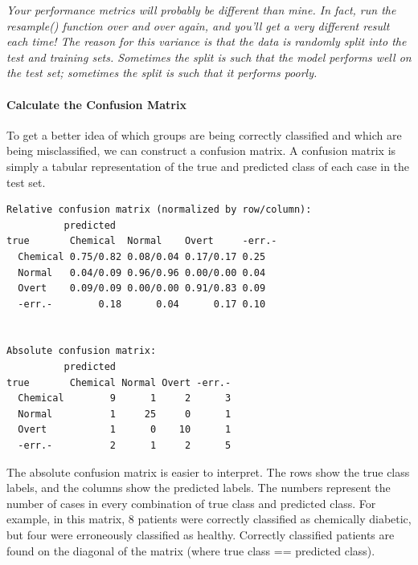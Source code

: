 \documentclass[
]{article}
\newenvironment{Shaded}{\begin{snugshade}}{\end{snugshade}}
\newcommand{\AttributeTok}[1]{\textcolor[rgb]{0.13,0.29,0.53}{#1}}
\newcommand{\ConstantTok}[1]{\textcolor[rgb]{0.56,0.35,0.01}{#1}}
\newcommand{\FunctionTok}[1]{\textcolor[rgb]{0.13,0.29,0.53}{\textbf{#1}}}
\newcommand{\NormalTok}[1]{#1}
\newcommand{\SpecialCharTok}[1]{\textcolor[rgb]{0.81,0.36,0.00}{\textbf{#1}}}
\begin{document}
\emph{Your performance metrics will probably be different than mine. In
fact, run the resample() function over and over again, and you'll get a
very different result each time! The reason for this variance is that
the data is randomly split into the test and training sets. Sometimes
the split is such that the model performs well on the test set;
sometimes the split is such that it performs poorly.}

\paragraph{Calculate the Confusion
Matrix}\label{calculate-the-confusion-matrix}

To get a better idea of which groups are being correctly classified and
which are being misclassified, we can construct a confusion matrix. A
confusion matrix is simply a tabular representation of the true and
predicted class of each case in the test set.

\begin{Shaded}
\end{Shaded}

\begin{verbatim}
Relative confusion matrix (normalized by row/column):
          predicted
true       Chemical  Normal    Overt     -err.-   
  Chemical 0.75/0.82 0.08/0.04 0.17/0.17 0.25     
  Normal   0.04/0.09 0.96/0.96 0.00/0.00 0.04     
  Overt    0.09/0.09 0.00/0.00 0.91/0.83 0.09     
  -err.-        0.18      0.04      0.17 0.10     


Absolute confusion matrix:
          predicted
true       Chemical Normal Overt -err.-
  Chemical        9      1     2      3
  Normal          1     25     0      1
  Overt           1      0    10      1
  -err.-          2      1     2      5
\end{verbatim}

The absolute confusion matrix is easier to interpret. The rows show the
true class labels, and the columns show the predicted labels. The
numbers represent the number of cases in every combination of true class
and predicted class. For example, in this matrix, 8 patients were
correctly classified as chemically diabetic, but four were erroneously
classified as healthy. Correctly classified patients are found on the
diagonal of the matrix (where true class == predicted class).
\end{document}
